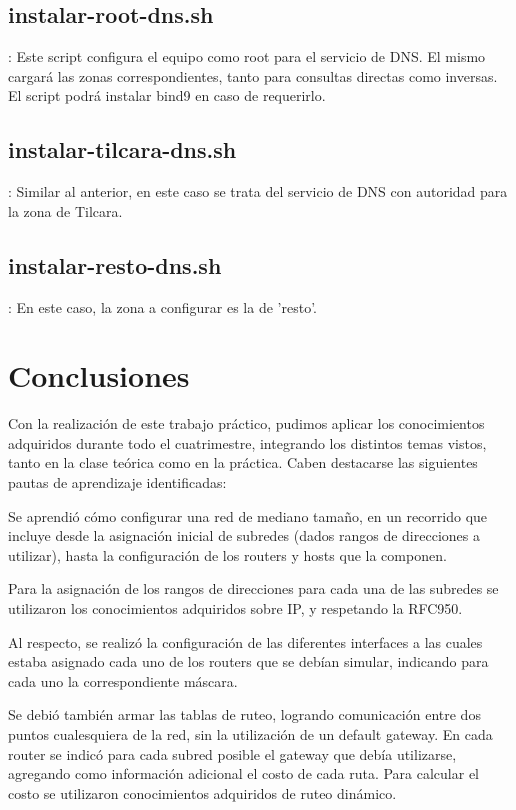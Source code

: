 \documentclass[12pt,titlepage]{article}
\begin{document}
\subsection{instalar-root-dns.sh}:
Este script configura el equipo como root para el servicio de DNS.
El mismo cargar\'a las zonas correspondientes, tanto para consultas directas como inversas.
El script podr\'a instalar bind9 en caso de requerirlo.

\subsection{instalar-tilcara-dns.sh}:
Similar al anterior, en este caso se trata del servicio de DNS con autoridad para la zona de Tilcara.

\subsection{instalar-resto-dns.sh}:
En este caso, la zona a configurar es la de 'resto'.

\section{Conclusiones}

Con la realizaci\'on de este trabajo pr\'actico, pudimos aplicar los conocimientos adquiridos durante todo el cuatrimestre, integrando los distintos temas vistos, tanto en la clase te\'orica como en la pr\'actica.
Caben destacarse las siguientes pautas de aprendizaje identificadas:

Se aprendi\'o c\'omo configurar una red de mediano tamaño, en un recorrido que incluye desde la asignaci\'on inicial de subredes (dados rangos de direcciones a utilizar), hasta la configuraci\'on de los routers y hosts que la componen.

Para la asignaci\'on de los rangos de direcciones para cada una de las subredes se utilizaron los conocimientos adquiridos sobre IP, y respetando la RFC950.

Al respecto, se realiz\'o la configuraci\'on de las diferentes interfaces a las cuales estaba asignado cada uno de los routers que se deb\'ian simular, indicando para cada uno la correspondiente m\'ascara.

Se debi\'o tambi\'en armar las tablas de ruteo, logrando comunicaci\'on entre dos puntos cualesquiera de la red, sin la utilizaci\'on de un default gateway. En cada router se indic\'o para cada subred posible el gateway que deb\'ia utilizarse, agregando como informaci\'on adicional el costo de cada ruta. Para calcular el costo se utilizaron conocimientos adquiridos de ruteo din\'amico.
\end{document}
